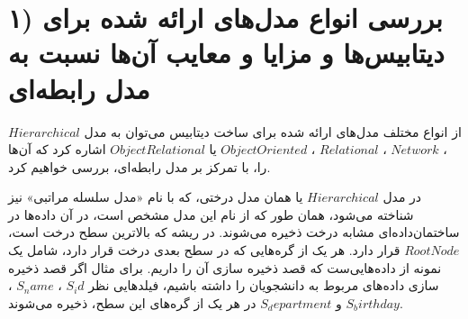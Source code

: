 
\section*{\centering ۱) بررسی انواع مدل‌های ارائه شده برای دیتابیس‌ها و مزایا و معایب آن‌ها نسبت به مدل رابطه‌ای
}



‌از انواع مختلف مدل‌های ارائه شده برای ساخت دیتابیس می‌توان به مدل 
$Hierarchical$
،‌
$Network$
،
$Relational$
،
$Object Oriented $
یا
$Object Relational$
اشاره کرد که آن‌ها را، با تمرکز بر مدل رابطه‌ای، بررسی خواهیم کرد.

در مدل 
$Hierarchical$
یا همان مدل درختی، که با نام «مدل سلسله مراتبی» نیز شناخته می‌شود،  همان طور که از نام این مدل مشخص است، در آن داده‌ها در ساختمان‌داده‌ای مشابه  درخت ذخیره می‌شوند.
در ریشه که بالاترین سطح درخت است، 
$Root Node$
قرار دارد.
هر یک از گره‌هایی که در سطح بعدی درخت قرار دارد، شامل یک نمونه از داده‌هایی‌ست که قصد ذخیره سازی آن را داریم.
برای مثال اگر قصد ذخیره سازی داده‌های مربوط به دانشجویان را داشته باشیم، فیلدهایی نظر 
$S_id$
،‌
$S_name$
،
$S_birthday$
و
$S_department$
در هر یک از گره‌های این سطح، ذخیره می‌شوند.


